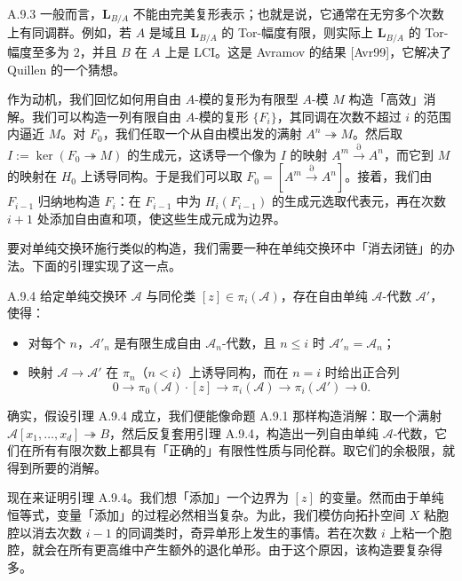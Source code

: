 \begin{rem}{A.9.3}\label{thm:a6-07-16}
一般而言，$\mathbf L_{B/A}$ 不能由完美复形表示；也就是说，它通常在无穷多个次数上有同调群。例如，若 $A$ 是域且 $\mathbf L_{B/A}$ 的 Tor-幅度有限，则实际上 $\mathbf L_{B/A}$ 的 Tor-幅度至多为 $2$，并且 $B$ 在 $A$ 上是 LCI。这是 Avramov 的结果 [Avr99]，它解决了 Quillen 的一个猜想。
\end{rem}

作为动机，我们回忆如何用自由 $A$-模的复形为有限型 $A$-模 $M$ 构造「高效」消解。我们可以构造一列有限自由 $A$-模的复形 $\{F_i\}$，其同调在次数不超过 $i$ 的范围内逼近 $M$。对 $F_0$，我们任取一个从自由模出发的满射 $A^n\twoheadrightarrow M$。然后取 $I:=\ker(F_0\twoheadrightarrow M)$ 的生成元，这诱导一个像为 $I$ 的映射 $A^m\xrightarrow{\partial}A^n$，而它到 $M$ 的映射在 $H_0$ 上诱导同构。于是我们可以取 $F_0=[A^m\xrightarrow{\partial}A^n]$。接着，我们由 $F_{i-1}$ 归纳地构造 $F_i$：在 $F_{i-1}$ 中为 $H_i(F_{i-1})$ 的生成元选取代表元，再在次数 $i+1$ 处添加自由直和项，使这些生成元成为边界。

要对单纯交换环施行类似的构造，我们需要一种在单纯交换环中「消去闭链」的办法。下面的引理实现了这一点。

\begin{lem}{A.9.4}\label{thm:a6-07-17}
给定单纯交换环 $\mathcal A$ 与同伦类 $[z]\in\pi_i(\mathcal A)$，存在自由单纯 $\mathcal A$-代数 $\mathcal A'$，使得：
\begin{itemize}
\item 对每个 $n$，$\mathcal A'_n$ 是有限生成自由 $\mathcal A_n$-代数，且 $n\le i$ 时 $\mathcal A'_n=\mathcal A_n$；
\item 映射 $\mathcal A\to\mathcal A'$ 在 $\pi_n$（$n<i$）上诱导同构，而在 $n=i$ 时给出正合列
\[
0\to\pi_0(\mathcal A)\cdot[z]\to\pi_i(\mathcal A)\to\pi_i(\mathcal A')\to0.
\]
\end{itemize}
\end{lem}

确实，假设引理 A.9.4 成立，我们便能像命题 A.9.1 那样构造消解：取一个满射 $\mathcal A[x_1,\dots,x_d]\twoheadrightarrow B$，然后反复套用引理 A.9.4，构造出一列自由单纯 $\mathcal A$-代数，它们在所有有限次数上都具有「正确的」有限性性质与同伦群。取它们的余极限，就得到所要的消解。

现在来证明引理 A.9.4。我们想「添加」一个边界为 $[z]$ 的变量。然而由于单纯恒等式，变量「添加」的过程必然相当复杂。为此，我们模仿向拓扑空间 $X$ 粘胞腔以消去次数 $i-1$ 的同调类时，奇异单形上发生的事情。若在次数 $i$ 上粘一个胞腔，就会在所有更高维中产生额外的退化单形。由于这个原因，该构造要复杂得多。

